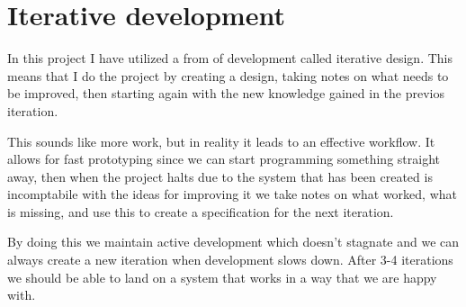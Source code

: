 \chapter{Iterative development}
In this project I have utilized a from of development called iterative design. This means that I do the project by creating a design, taking notes on what needs to be improved, then starting again with the new knowledge gained in the previos iteration. 

This sounds like more work, but in reality it leads to an effective workflow. It allows for fast prototyping since we can start programming something straight away, then when the project halts due to the system that has been created is incomptabile with the ideas for improving it we take notes on what worked, what is missing, and use this to create a specification for the next iteration. 

By doing this we maintain active development which doesn't stagnate and we can always create a new iteration when development slows down. After 3-4 iterations we should be able to land on a system that works in a way that we are happy with.



\clearpage{}



\cleapage{}




